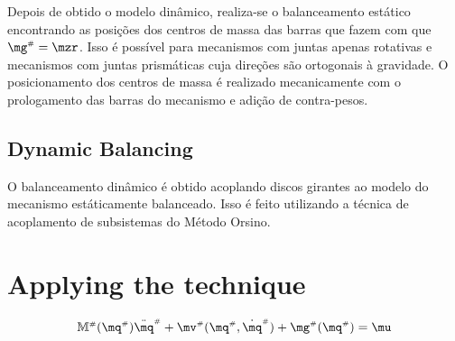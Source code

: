 \documentclass[a4paper,11pt,brazil,fleqn]{article}
\begin{document}
Depois de obtido o modelo din\^{a}mico, realiza-se o balanceamento est\'{a}tico encontrando as posi\c{c}\~{o}es dos centros de massa das barras que fazem com que $\mg\ssh = \mzr$. Isso \'{e} poss\'{i}vel para mecanismos com juntas apenas rotativas e mecanismos com juntas prism\'{a}ticas cuja dire\c{c}\~{o}es s\~{a}o ortogonais \`{a} gravidade. O posicionamento dos centros de massa \'e realizado mecanicamente com o prologamento das barras do mecanismo e adi\c{c}\~ao de contra-pesos.

\subsection{Dynamic Balancing}\label{S02-3}

O balanceamento din\^{a}mico \'{e} obtido acoplando discos girantes ao modelo do mecanismo est\'{a}ticamente balanceado. Isso \'{e} feito utilizando a t\'{e}cnica de acoplamento de subsistemas do M\'{e}todo Orsino.



\section{Applying the technique}\label{S03}

\begin{equation}
\mM\ssh (\mq\ssh) \ddot{\mq}\ssh + \mv\ssh(\mq\ssh,\dot{\mq}\ssh) + \mg\ssh (\mq\ssh) = \mu
\end{equation}
\end{document}
